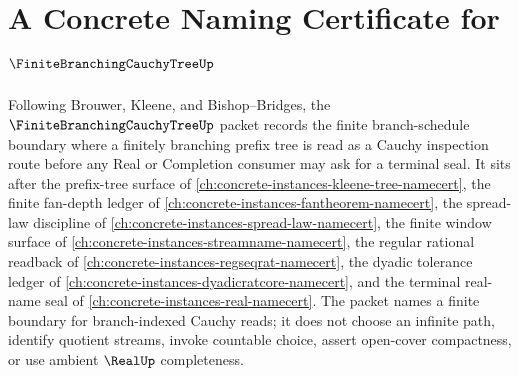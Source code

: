 \chapter{A Concrete Naming Certificate for $\FiniteBranchingCauchyTreeUp$}
\label{ch:concrete-instances-finite-branching-cauchy-tree-namecert}

Following Brouwer, Kleene, and Bishop--Bridges, the $\FiniteBranchingCauchyTreeUp$ packet records the finite branch-schedule boundary where a finitely branching prefix tree is read as a Cauchy inspection route before any Real or Completion consumer may ask for a terminal seal. It sits after the prefix-tree surface of \autoref{ch:concrete-instances-kleene-tree-namecert}, the finite fan-depth ledger of \autoref{ch:concrete-instances-fantheorem-namecert}, the spread-law discipline of \autoref{ch:concrete-instances-spread-law-namecert}, the finite window surface of \autoref{ch:concrete-instances-streamname-namecert}, the regular rational readback of \autoref{ch:concrete-instances-regseqrat-namecert}, the dyadic tolerance ledger of \autoref{ch:concrete-instances-dyadicratcore-namecert}, and the terminal real-name seal of \autoref{ch:concrete-instances-real-namecert}. The packet names a finite boundary for branch-indexed Cauchy reads; it does not choose an infinite path, identify quotient streams, invoke countable choice, assert open-cover compactness, or use ambient $\RealUp$ completeness.

